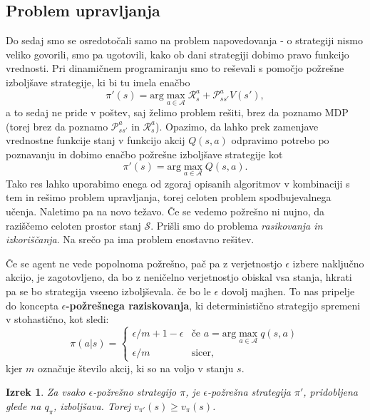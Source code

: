 \documentclass[12pt,a4paper]{amsart}
\theoremstyle{definition} %
\theoremstyle{plain} %
\newtheorem{izrek}[definicija]{Izrek}
\begin{document}
\subsection{Problem upravljanja}
Do sedaj smo se osredotočali samo na problem napovedovanja - o strategiji nismo veliko govorili, 
smo pa ugotovili, kako ob dani strategiji dobimo pravo funkcijo vrednosti. Pri dinamičnem 
programiranju smo to reševali s pomočjo požrešne izboljšave strategije, ki bi tu imela enačbo
$$
\pi'(s) = \text{arg}\max_{a \in \mathcal{A}} \mathcal{R}_s^a + \mathcal{P}_{ss'}^a V(s'),
$$
a to sedaj ne pride v poštev, saj želimo problem rešiti, brez da poznamo MDP (torej brez da 
poznamo $\mathcal{P}_{ss'}^a$ in $\mathcal{R}_s^a$). Opazimo, da lahko prek zamenjave vrednostne 
funkcije stanj v funkcijo akcij $Q(s, a)$ odpravimo potrebo po poznavanju in dobimo enačbo požrešne
izboljšave strategije kot 
\begin{equation}\label{PIS}
    \pi'(s) = \text{arg}\max_{a \in \mathcal{A}} Q(s, a).
\end{equation}
Tako res lahko uporabimo enega od zgoraj opisanih algoritmov v kombinaciji s tem in rešimo problem 
upravljanja, torej celoten problem spodbujevalnega učenja. Naletimo pa na novo težavo. Če se vedemo
požrešno ni nujno, da raziščemo celoten prostor stanj $\mathcal{S}$. Prišli smo do problema 
\textit{rasikovanja in izkoriščanja}. Na srečo pa ima problem enostavno rešitev.

Če se agent ne vede popolnoma požrešno, pač pa z verjetnostjo $\epsilon$ izbere naključno akcijo, 
je zagotovljeno, da bo z neničelno verjetnostjo obiskal vsa stanja, hkrati pa se bo strategija 
vseeno izboljševala. če bo le $\epsilon$ dovolj majhen. To nas pripelje do koncepta \textbf{
$\epsilon$-požrešnega raziskovanja}, ki deterministično strategijo spremeni v stohastično, kot
sledi:
\begin{equation}
    \pi(a|s) = \begin{cases}
                \epsilon / m + 1 - \epsilon & \text{če } a = \text{arg}\max_{a \in 
                    \mathcal{A}} q(s, a) \\
                    \epsilon / m & \text{sicer},
               \end{cases}
\end{equation}
kjer $m$ označuje število akcij, ki so na voljo v stanju $s$.

\begin{izrek}
    Za vsako $\epsilon$-požrešno strategijo $\pi$, je $\epsilon$-požrešna strategija $\pi'$, 
    pridobljena glede na $q_\pi$, izboljšava. Torej $v_{\pi'}(s) \geq v_\pi(s)$. 
\end{izrek}
\end{document}

